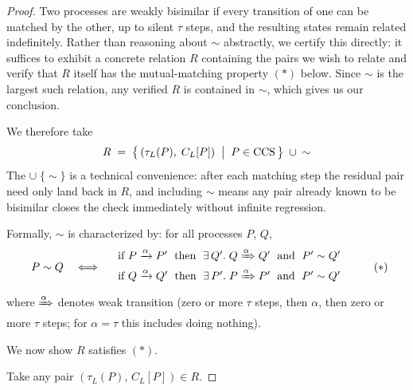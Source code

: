 \documentclass{article}
\begin{document}
\begin{proof}
  Two processes are weakly bisimilar if every transition of one can be matched by the other,
  up to silent $\tau$ steps, and the resulting states remain related indefinitely.
  Rather than reasoning about $\sim$ abstractly, we certify this directly: it suffices to
  exhibit a concrete relation $R$ containing the pairs we wish to relate and verify that
  $R$ itself has the mutual-matching property $(*)$ below. Since $\sim$ is the largest
  such relation, any verified $R$ is contained in $\sim$, which gives us our conclusion.

  We therefore take
  \[
    R \;=\; \bigl\{\,(\tau_L(P),\; C_L[P]) \;\bigm|\; P \in \text{CCS}\,\bigr\} \;\cup\; {\sim}
  \]
  The $\cup\;\{\sim\}$ is a technical convenience: after each matching step the residual pair
  need only land back in $R$, and including $\sim$ means any pair already known to be
  bisimilar closes the check immediately without infinite regression.

  Formally, $\sim$ is characterized by: for all processes $P$, $Q$,
  \[
    \begin{array}{rcl}
      P \sim Q &
      \iff &
      \begin{array}{l}
        \text{if } P \xrightarrow{\alpha} P' \;\text{ then }\; \exists\, Q'.\; Q \xRightarrow{\alpha} Q' \;\text{ and }\; P' \sim Q'\\[.5em]
        \text{if } Q \xrightarrow{\alpha} Q' \;\text{ then }\; \exists\, P'.\; P \xRightarrow{\alpha} P' \;\text{ and }\; P' \sim Q'
      \end{array}
    \end{array}
    \tag{$*$}
  \]
  where $\xRightarrow{\alpha}$ denotes weak transition (zero or more $\tau$ steps, 
  then $\alpha$, then zero or more $\tau$ steps; for $\alpha = \tau$ this includes 
  doing nothing).
  
  We now show $R$ satisfies $(*)$. 
  
  \newpage 

  Take any pair $(\tau_L(P),\, C_L[P]) \in R$.


\end{proof}
\end{document}
